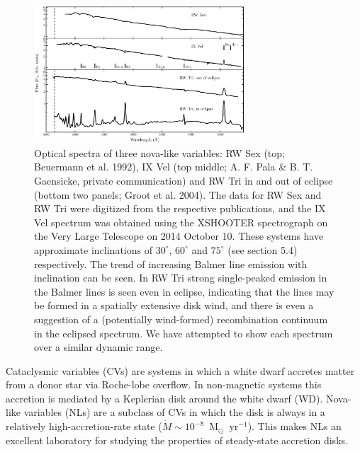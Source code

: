 \documentclass[preprint, a4paper, 11pt]{aastex}
\begin{document}
\begin{figure}	%
\centering
\includegraphics[width=0.7\textwidth]{figures/fig1.eps}
\caption{
Optical spectra of three nova-like variables: 
RW Sex (top; Beuermann et al. 1992),
IX Vel (top middle; A. F. Pala \& B. T. Gaensicke, private communication) 
and RW Tri in and out of eclipse (bottom two panels; Groot et al. 2004).
The data for RW Sex and RW Tri were digitized from the respective publications,
and the IX Vel spectrum was obtained using the XSHOOTER spectrograph 
on the Very Large Telescope on 2014 October 10.
These systems have approximate inclinations of $30^\circ$, $60^\circ$ and $75^\circ$ 
(see section 5.4) respectively. 
The trend of increasing Balmer line emission with inclination can be seen.
In RW Tri strong single-peaked emission in the Balmer lines is seen even
in eclipse, indicating that the lines may be formed in a spatially
extensive disk wind, and there is even a suggestion 
of a (potentially wind-formed) recombination continuum in the eclipsed
spectrum. We have attempted to show each spectrum over a similar dynamic range.
}
\label{novalikes}
\end{figure}

Cataclysmic variables (CVs) are systems in which a white dwarf
accretes matter from a donor star via Roche-lobe overflow. In
non-magnetic systems this accretion is mediated by a Keplerian disk
around the white dwarf (WD). Nova-like variables (NLs) are a subclass
of CVs in which the  disk is always in a relatively
high-accretion-rate state ($\dot{M} \sim
10^{-8}$~M$_{\odot}$~yr$^{-1}$).  This makes NLs an excellent
laboratory for studying the properties of steady-state accretion
disks.
\end{document}
